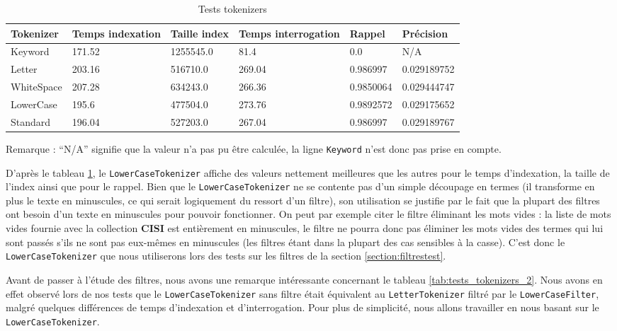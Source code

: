 \begin{table}[!htbp]
    \hspace{-1.5cm}
                \begin{tabular}{|p{2.5cm}|p{2.5cm}|p{2.5cm}|p{2.5cm}|p{2.5cm}|p{2.5cm}|}
                    \hline
                    \textbf{Tokenizer} & \textbf{Temps \mbox{indexation}} & \textbf{Taille \mbox{index}} & \textbf{Temps \mbox{interrogation}} & \textbf{Rappel} & \textbf{Précision}\\
                    \hline     
Keyword & 171.52 & 1255545.0 & 81.4 & 0.0 & N/A\\
		\hline
Letter & 203.16 & 516710.0 & 269.04 & 0.986997 & 0.029189752\\
		\hline
WhiteSpace & 207.28 & 634243.0 & 266.36 & 0.9850064 & 0.029444747\\
		\hline
LowerCase & 195.6 & 477504.0 & 273.76 & 0.9892572 & 0.029175652\\
		\hline
Standard & 196.04 & 527203.0 & 267.04 & 0.986997 & 0.029189767\\
                    \hline
                \end{tabular}
                \caption{Tests tokenizers}
                \label{tab:tests_tokenizers}
            \end{table}

Remarque : “N/A” signifie que la valeur n'a pas pu être calculée, la ligne \texttt{Keyword} n’est donc pas prise en compte.

D'après le tableau \ref{tab:tests_tokenizers}, le \texttt{LowerCaseTokenizer} affiche des valeurs nettement meilleures que les autres pour le temps d’indexation, la taille de l’index ainsi que pour le rappel. Bien que le \texttt{LowerCaseTokenizer} ne se contente pas d'un simple découpage en termes (il transforme en plus le texte en minuscules, ce qui serait logiquement du ressort d'un filtre), son utilisation se justifie par le fait que la plupart des filtres ont besoin d'un texte en minuscules pour pouvoir fonctionner. On peut par exemple citer le filtre éliminant les mots vides : la liste de mots vides fournie avec la collection \textbf{CISI} est entièrement en minuscules, le filtre ne pourra donc pas éliminer les mots vides des termes qui lui sont passés s'ils ne sont pas eux-mêmes en minuscules (les filtres étant dans la plupart des cas sensibles à la casse). C’est donc le \texttt{LowerCaseTokenizer} que nous utiliserons lors des tests sur les filtres de la section \ref{section:filtrestest}.

Avant de passer à l'étude des filtres, nous avons une remarque intéressante concernant le tableau \ref{tab:tests_tokenizers_2}. Nous avons en effet observé lors de nos tests que le \texttt{LowerCaseTokenizer} sans filtre était équivalent au \texttt{LetterTokenizer} filtré par le \texttt{LowerCaseFilter}, malgré quelques différences de temps d’indexation et d’interrogation. Pour plus de simplicité, nous allons travailler en nous basant sur le \texttt{LowerCaseTokenizer}.

